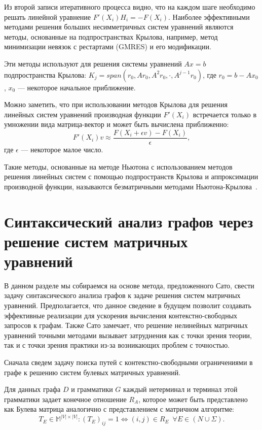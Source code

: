 \documentclass[12pt]{matmex-diploma-custom}
\begin{document}
Из второй записи итеративного процесса видно, что на каждом шаге необходимо решать линейной уравнение $F'(X_i) H_i = -F(X_i)$. Наиболее эффективными методами решения больших несимметричных систем уравнений являются методы, основанные на подпространствах Крылова, например, метод минимизации невязок с рестартами (GMRES) и его модификации.

Эти методы используют для решения системы уравнений $Ax = b$ подпространства Крылова: $K_j = span(r_0, Ar_0, A^2r_0, \cdot, A^{j-1}r_0)$, где $r_0 = b - A x_0$, $x_0$ --- некоторое начальное приближение.

Можно заметить, что при использовании методов Крылова для решения линейных систем уравнений производная функции $F'(X_i)$ встречается только в умножении вида матрица-вектор и может быть вычислена приближенно:
$$F'(X_i)v \approx \frac{F(X_i + \epsilon v) - F(X_i)}{\epsilon},$$
где $\epsilon$ --- некоторое малое число.

Такие методы, основанные на методе Ньютона с использованием методов решения линейных систем с помощью подпространств Крылова и аппроксимации производной функции, называются безматричными методами Ньютона-Крылова~\cite{knoll2004jacobian}. 



\section{Синтаксический анализ графов через решение систем матричных уравнений}

В данном разделе мы собираемся на основе метода, предложенного Сато, свести задачу синтаксического анализа графов к задаче решения систем матричных уравнений. Предполагается, что данное сведение в будущем позволит создавать эффективные реализации для ускорения вычисления контекстно-свободных запросов к графам. Также Сато замечает, что решение нелинейных матричных уравнений точными методами вызывает затруднения как с точки зрения теории, так и с точки зрения практики из-за возникающих проблем с точностью. 


Сначала сведем задачу поиска путей с контекстно-свободными ограничениями в графе к решению систем булевых матричных уравнений.  


Для данных графа $D$ и грамматики $G$ каждый нетерминал и терминал этой грамматики задает конечное отношение $R_A$, которое может быть представлено как Булева матрица аналогично с представлением с матричном алгоритме: 
$$T_E \in \mathbb{M}^{|V| \times |V|}: (T_{E})_{ij} = 1 \iff (i,j) \in R_E \; \  \forall E \in (N \cup \Sigma).$$
\end{document}
